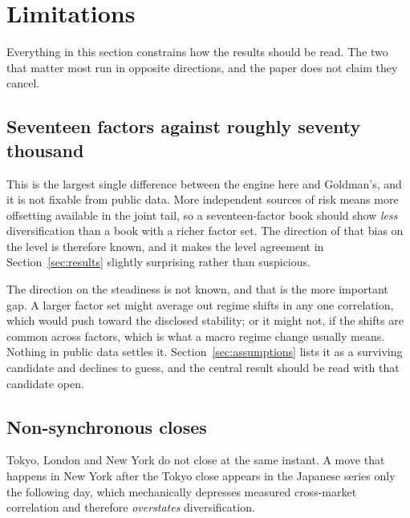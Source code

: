 %

\section{Limitations}\label{sec:limitations}

Everything in this section constrains how the results should be read. The two
that matter most run in opposite directions, and the paper does not claim they
cancel.

\subsection{Seventeen factors against roughly seventy thousand}

This is the largest single difference between the engine here and Goldman's,
and it is not fixable from public data. More independent sources of risk means
more offsetting available in the joint tail, so a seventeen-factor book should
show \emph{less} diversification than a book with a richer factor set. The
direction of that bias on the level is therefore known, and it makes the level
agreement in Section~\ref{sec:results} slightly surprising rather than
suspicious.

The direction on the steadiness is not known, and that is the more important
gap. A larger factor set might average out regime shifts in any one
correlation, which would push toward the disclosed stability; or it might not,
if the shifts are common across factors, which is what a macro regime change
usually means. Nothing in public data settles it. Section~\ref{sec:assumptions}
lists it as a surviving candidate and declines to guess, and the central result
should be read with that candidate open.

\subsection{Non-synchronous closes}

Tokyo, London and New York do not close at the same instant. A move that
happens in New York after the Tokyo close appears in the Japanese series only
the following day, which mechanically depresses measured cross-market
correlation and therefore \emph{overstates} diversification.

